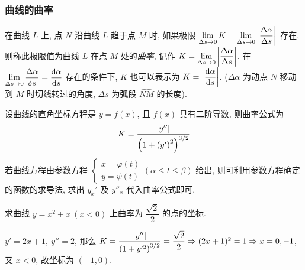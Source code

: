 \subsubsection{曲线的曲率}

\begin{definition}[曲率]
    在曲线 $L$ 上, 点 $N$ 沿曲线 $L$ 趋于点 $M$ 时, 如果极限 $\displaystyle\lim_{\Delta s\to0}\bar{K}=\lim_{\Delta s\to0}\qty|\dfrac{\Delta\alpha}{\Delta s}|$ 存在, 则称此极限值为曲线 $L$ 在点 $M$ 处的\textit{曲率}, 记作 $K=\displaystyle\lim_{\Delta s\to0}\qty|\dfrac{\Delta\alpha}{\Delta s}|$.
    在 $\displaystyle\lim_{\Delta s\to0}\dfrac{\Delta\alpha}{\delta s}=\dv{\alpha}{s}$ 存在的条件下, $K$ 也可以表示为 $K=\qty|\dfrac{\dd \alpha}{\dd s}|$. ($\Delta \alpha$ 为动点 $N$ 移动到 $M$ 时切线转过的角度, $\Delta s$ 为弧段 $\widehat{NM} $ 的长度).
\end{definition}

\begin{theorem}[曲率的计算公式]
    设曲线的直角坐标方程是 $y=f(x)$, 且 $f(x)$ 具有二阶导数, 则曲率公式为 $$K=\dfrac{|y''|}{\qty(1+\qty(y')^2)^{3/2}}$$
    若曲线方程由参数方程 $\begin{cases}
            x=\varphi(t) \\y=\psi(t)
        \end{cases}(\alpha \leqslant t\leqslant \beta)$ 给出, 则可利用参数方程确定的函数的求导法, 求出 $y_x'$ 及 $y''_x$ 代入曲率公式即可.
\end{theorem}

\begin{example}[2012 数二]
    求曲线 $y=x^2+x~(x<0)$ 上曲率为 $\dfrac{\sqrt{2}}{2}$ 的点的坐标.
\end{example}
\begin{solution}
    $y'=2x+1,~y''=2$, 那么 $K=\dfrac{|y''|}{\qty(1+y'^2)^{3/2}}=\dfrac{\sqrt{2}}{2}\Rightarrow (2x+1)^2=1\Rightarrow x=0,-1$, 又 $x<0$, 故坐标为 $(-1,0).$
\end{solution}

